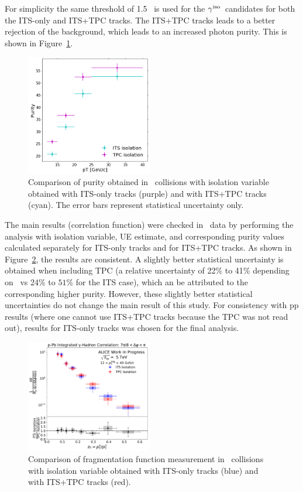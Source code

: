 For simplicity the same threshold of 1.5 \GeVc~is used for the $\gamma^\mathrm{iso}$~candidates for both the ITS-only and ITS+TPC tracks. The ITS+TPC tracks leads to a better rejection of the background, which leads to an increased photon purity. This is shown in Figure~\ref{fig:ComparisonTPCITSiso_purity}. 

\begin{figure}[hbt]
	\center
	\includegraphics[width=0.49\textwidth]{Checks_Systematics/PurityITSTPC.png}
	\caption{Comparison of purity obtained in \pPb~collisions with isolation variable obtained with ITS-only tracks (purple) and with ITS+TPC tracks (cyan). The error bars represent statistical uncertainty only. }
	\label{fig:ComparisonTPCITSiso_purity}
\end{figure}

The main results (correlation function) were checked in \pPb~data by performing the analysis with isolation variable, UE estimate, and corresponding purity values calculated separately for ITS-only tracks and for ITS+TPC tracks. As shown in Figure~\ref{fig:ComparisonTPCITSiso_frag}, the results are consistent. A slightly better statistical uncertainty is obtained when including TPC (a relative uncertainty of 22$\%$ to 41$\%$ depending on \zt~vs 24$\%$ to $51\%$ for the ITS case), which an be attributed to the corresponding higher purity. However, these slightly better statistical uncertainties do not change the main result of this study. For consistency with pp results (where one cannot use ITS+TPC tracks because the TPC was not read out), results for ITS-only tracks was chosen for the final analysis. 

\begin{figure}
	\center
	\includegraphics[width=0.49\textwidth]{Checks_Systematics/ISO_Compare_Final_FFunction_and_Ratio}
	\caption{Comparison of fragmentation function measurement in \pPb~collisions with isolation variable obtained with ITS-only tracks (blue) and with ITS+TPC tracks (red).}
	\label{fig:ComparisonTPCITSiso_frag}
\end{figure}

